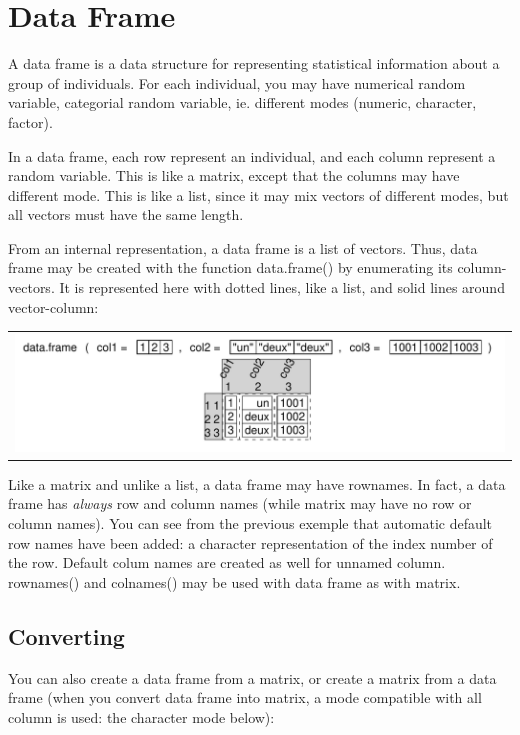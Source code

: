 \documentclass[pdflatex]{article}
\begin{document}
\section{Data Frame}

A data frame is a data structure for representing statistical information about
a group of individuals. For each individual, you may have numerical random
variable, categorial random variable, ie. different modes (numeric, character,
factor).

In a data frame, each row represent an individual, and each column represent a
random variable. This is like a matrix, except that the columns may have
different mode. This is like a list, since it may mix vectors of different
modes, but all vectors must have the same length.

From an internal representation, a data frame is a list of vectors. Thus, data
frame may be created with the function data.frame() by enumerating its
column-vectors. It is represented here with dotted lines, like a list, and
solid lines around vector-column:

\begin{tabular}{c}
\includegraphics{dataframe.pdf}
\end{tabular}

Like a matrix and unlike a list, a data frame may have rownames. In fact, a
data frame has \emph{always} row and column names (while matrix may have no row
or column names). You can see from the previous exemple that automatic default
row names have been added: a character representation of the index number of
the row. Default colum names are created as well for unnamed column. rownames() and colnames() may be used with data frame as with matrix.
 
\subsection{Converting}

You can also create a data frame from a matrix, or create a matrix from a data frame (when you convert data frame into matrix, a mode compatible with all column is used: the character mode below):
\end{document}
